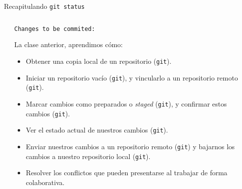 \begin{frame}[t]{Recapitulando}
    \pause
    \texttt{git status}
    \vspace{.4em}

    \begin{columns}[t]
        \begin{column}{0.05\textwidth}

        \end{column}
        \begin{column}{0.90\textwidth}
            \pause
            \hspace{-.25em}\texttt{Changes to be commited:}

            \pause
            \begin{block}{La clase anterior, aprendimos cómo:}
                \begin{itemize}
                    \pause
                    \item Obtener una copia local de un repositorio (\texttt{git}).
                    \pause\pause
                    \item Iniciar un repositorio vacío (\texttt{git}), \pause\pause
                    y vincularlo a un repositorio remoto (\texttt{git}).
                    \pause\pause
                    \item Marcar cambios como preparados o \textit{staged} (\texttt{git}),
                    \pause\pause y confirmar estos cambios (\texttt{git}).
                    \pause\pause
                    \item Ver el estado actual de nuestros cambios (\texttt{git}).
                    \pause\pause
                    \item Enviar nuestros cambios a un repositorio remoto (\texttt{git}) y
                    bajarnos los cambios a nuestro repositorio local (\texttt{git}).
                    \item Resolver los conflictos que pueden presentarse al trabajar de forma colaborativa.
                \end{itemize}
            \end{block}

        \end{column}
        \begin{column}{0.05\textwidth}

        \end{column}
    \end{columns}

\end{frame}

